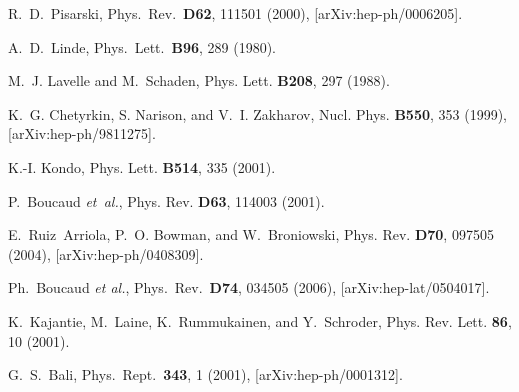 \begin{thebibliography}{10}


  R.~D.~Pisarski,
  Phys.\ Rev.\ {\bf D62}, 111501 (2000),
  [arXiv:hep-ph/0006205].


  A.~D.~Linde,
  Phys.\ Lett.\ {\bf B96}, 289 (1980).

M.~J. Lavelle and M.~Schaden,
\newblock Phys. Lett. {\bf B208}, 297 (1988).

K.~G. Chetyrkin, S. Narison, and V.~I. Zakharov,
\newblock Nucl. Phys. {\bf B550}, 353 (1999), [arXiv:hep-ph/9811275].

K.-I. Kondo,
\newblock Phys. Lett. {\bf B514}, 335 (2001).%

P.~Boucaud {\em et~al.},
\newblock Phys. Rev. {\bf D63}, 114003 (2001).%

E.~Ruiz~Arriola, P.~O. Bowman, and W.~Broniowski,
\newblock Phys. Rev. {\bf D70}, 097505 (2004), [arXiv:hep-ph/0408309].

  Ph.~Boucaud {\it et al.},
  Phys.\ Rev.\  {\bf D74}, 034505 (2006),
  [arXiv:hep-lat/0504017].



K.~Kajantie, M.~Laine, K.~Rummukainen, and Y.~Schroder,
\newblock Phys. Rev. Lett. {\bf 86}, 10 (2001).%



  G.~S.~Bali,
  Phys.\ Rept.\  {\bf 343}, 1 (2001),
  [arXiv:hep-ph/0001312].


\end{thebibliography}
